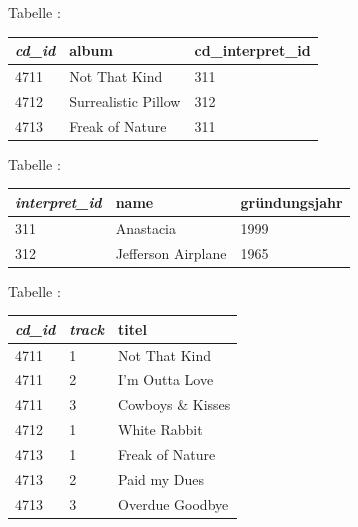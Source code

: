 \begin{minipage}{0.48\textwidth}
Tabelle :

\vspace{2mm}

\hspace{0mm}
\begin{tabular}{|l|l|l|}\hline
\textbf{\em cd\_id} & \textbf{album} & \textbf{cd\_interpret\_id}\\ \hline 
4711 & Not That Kind       & 311\\ \hline
4712 & Surrealistic Pillow & 312\\ \hline
4713 & Freak of Nature     & 311\\ \hline
\end{tabular}
\end{minipage}
\begin{minipage}{0.52\textwidth}
Tabelle :

\vspace{2mm}

\begin{tabular}{|l|l|l|}\hline
\textbf{\em interpret\_id} & \textbf{name} & \textbf{gründungsjahr}\\ \hline
311 & Anastacia          & 1999\\ \hline
312 & Jefferson Airplane & 1965\\ \hline
\end{tabular}
\end{minipage}

\vspace{4mm}

\begin{minipage}{1.0\textwidth}
Tabelle :

\vspace{2mm}

\begin{tabular}{|l|l|l|}\hline
\textbf{\em cd\_id} & \textbf{\em track} & \textbf{titel}\\ \hline
4711 & 1 & Not That Kind\\ \hline
4711 & 2 & I'm Outta Love\\ \hline
4711 & 3 & Cowboys \& Kisses\\ \hline
4712 & 1 & White Rabbit\\ \hline
4713 & 1 & Freak of Nature\\ \hline
4713 & 2 & Paid my Dues\\ \hline
4713 & 3 & Overdue Goodbye\\ \hline
\end{tabular}
\end{minipage}

